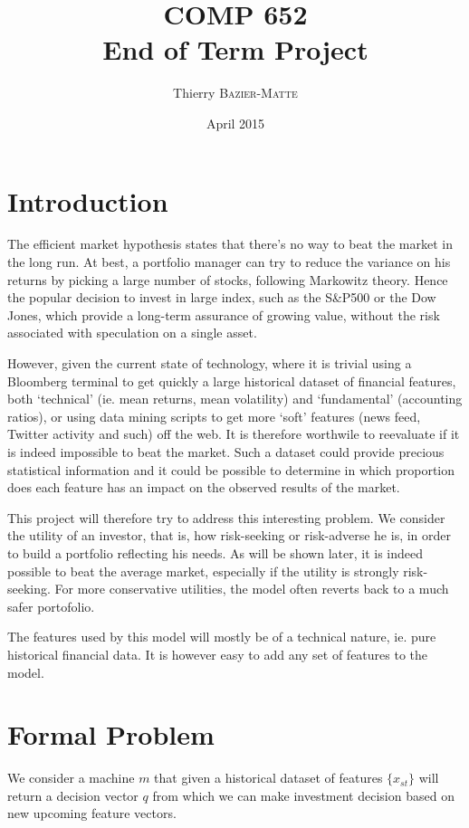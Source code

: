 \documentclass[11pt,fleqn]{article}
\title{COMP 652 \\ End of Term Project}
\author{Thierry \textsc{Bazier-Matte}}
\date{April 2015}
\begin{document}
\maketitle

\section{Introduction}

The efficient market hypothesis states that there's no way to beat the market in the long
run. At best, a portfolio manager can try to reduce the variance on his returns by picking
a large number of stocks, following Markowitz theory. Hence the popular decision to invest
in large index, such as the S\&P500 or the Dow Jones, which provide a long-term assurance
of growing value, without the risk associated with speculation on a single asset.

However, given the current state of technology, where it is trivial using a Bloomberg
terminal to get quickly a large historical dataset of financial features, both `technical'
(ie. mean returns, mean volatility) and `fundamental' (accounting ratios), or using data
mining scripts to get more `soft' features (news feed, Twitter activity and such) off the
web.  It is therefore worthwile to reevaluate if it is indeed impossible to beat the
market. Such a dataset could provide precious statistical information and it could be
possible to determine in which proportion does each feature has an impact on the observed
results of the market.

This project will therefore try to address this interesting problem. We consider the
utility of an investor, that is, how risk-seeking or risk-adverse he is, in order to build
a portfolio reflecting his needs. As will be shown later, it is indeed possible to beat
the average market, especially if the utility is strongly risk-seeking. For more
conservative utilities, the model often reverts back to a much safer portofolio. 

The features used by this model will mostly be of a technical nature, ie. pure historical
financial data. It is however easy to add any set of features to the model.

\section{Formal Problem}

We consider a machine $m$ that given a historical dataset of features $\{x_{st}\}$ will
return a decision vector $q$ from which we can make investment decision based on new
upcoming feature vectors. 
\end{document}
